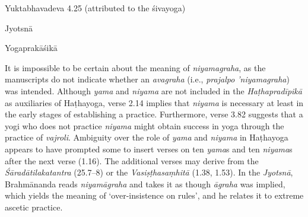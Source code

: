 \begin{ekdosis}
\begin{testimonia}[hp01_015]
\begin{versinnote}
\end{versinnote}

Yuktabhavadeva 4.25 (attributed to the śivayoga)

\begin{versinnote}
\end{versinnote}

Jyotsnā

\begin{versinnote}
\end{versinnote}

Yogaprakāśikā

\begin{versinnote}
\end{versinnote}

\end{testimonia}

\begin{philcomm}[hp01_015]        
It is impossible to be certain about the meaning of \emph{niyamagraha}, as the manuscripts do not indicate whether an \emph{avagraha} (i.e., \emph{prajalpo ’niyamagraha}) was intended. Although \emph{yama} and \emph{niyama} are not included in the \emph{Haṭhapradīpikā} as auxiliaries of Haṭhayoga, verse 2.14 implies that \emph{niyama} is necessary at least in the early stages of establishing a practice. Furthermore, verse 3.82 suggests that a yogi who does not practice \emph{niyama} might obtain success in yoga through the practice of \textit{vajroli}. Ambiguity over the role of \emph{yama} and \emph{niyama} in Haṭhayoga appears to have prompted some to insert verses on ten \emph{yama}s and ten \emph{niyama}s after the next verse (1.16). The additional verses may derive from the \emph{Śāradātilakatantra} (25.7–8) or the  \emph{Vasiṣṭhasaṃhitā} (1.38, 1.53). In the \emph{Jyotsnā}, Brahmānanda reads \emph{niyamāgraha} and takes it as though \emph{āgraha} was implied, which yields the meaning of ‘over-insistence on rules’, and he relates it to extreme ascetic practice.
\end{philcomm}


\end{ekdosis}
